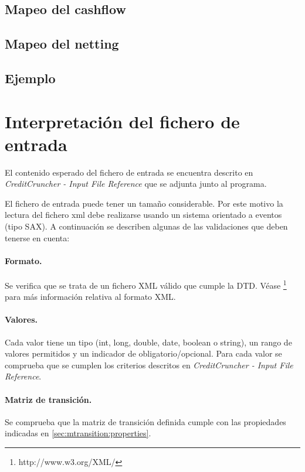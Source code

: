 \subsection{Mapeo del cashflow}

\subsection{Mapeo del netting}

\subsection{Ejemplo}


\section{Interpretaci\'on del fichero de entrada}

El contenido esperado del fichero de entrada se encuentra
descrito en \emph{CreditCruncher - Input File Reference}
que se adjunta junto al programa.

El fichero de entrada puede tener un tama\~no considerable. Por
este motivo la lectura del fichero xml debe realizarse usando un
sistema orientado a eventos (tipo SAX). A continuaci\'on se
describen algunas de las validaciones que deben tenerse en cuenta:

\paragraph{Formato.} Se verifica que se trata de un fichero XML
v\'alido que cumple la DTD. V\'ease \footnote{http://www.w3.org/XML/}
para m\'as informaci\'on relativa al formato XML.

\paragraph{Valores.} Cada valor tiene un tipo (int, long, double,
date, boolean o string), un rango de valores permitidos y un
indicador de obligatorio/opcional. Para cada valor se comprueba
que se cumplen los criterios descritos en
\emph{CreditCruncher - Input File Reference}.

\paragraph{Matriz de transici\'on.} Se comprueba que la matriz de
transici\'on definida cumple con las propiedades indicadas en
\ref{sec:mtransition:properties}.

